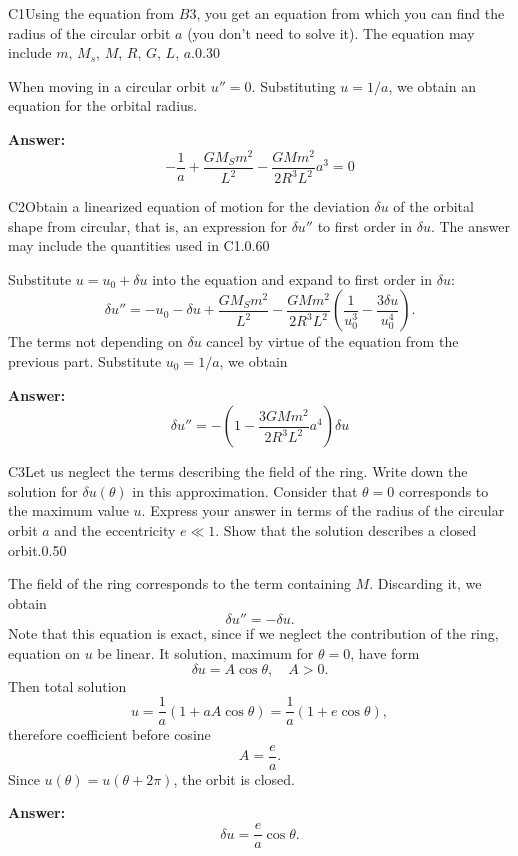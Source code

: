 \documentclass[11pt,a4paper]{article}
\begin{document}
\begin{solcard}{C1}{Using the equation from $B3$, you get an equation from which you can find the radius of the circular orbit $a$ (you don't need to solve it). The equation may include $m$, $M_s$, $M$, $R$, $G$, $L$, $a$.}{0.30}

When moving in a circular orbit $u'' = 0$. Substituting $u = 1/a$, we obtain an equation for the orbital radius.

\par\smallskip\noindent\textbf{Answer:} $$ - \frac{1}{a} + \frac{G M_S m^2 }{L^2}- \frac{GM m^2}{2 R^3 L^2} a^3 = 0 $$
\end{solcard}

\begin{solcard}{C2}{Obtain a linearized equation of motion for the deviation $\delta u$ of the orbital shape from circular, that is, an expression for $\delta u''$ to first order in $\delta u$. The answer may include the quantities used in C1.}{0.60}

Substitute $u = u_0 + \delta u$ into the equation and expand to first order in $\delta u$: $$ \delta u '' = - u_0 - \delta u+  \frac{G M_S m^2 }{L^2} - \frac{GM m^2}{2 R^3 L^2} \left(\frac{1}{u_0^3}  - \frac{3 \delta u}{u_0^4} \right). $$The terms not depending on $\delta u$ cancel by virtue of the equation from the previous part. Substitute $u_0 = 1/a$, we obtain

\par\smallskip\noindent\textbf{Answer:} $$ \delta u'' = - \left( 1 - \frac{3 G M m^2}{2 R^3 L^2} a^4\right) \delta u $$
\end{solcard}

\begin{solcard}{C3}{Let us neglect the terms describing the field of the ring. Write down the solution for $\delta u(\theta)$ in this approximation. Consider that $\theta = 0$ corresponds to the maximum value $u$. Express your answer in terms of the radius of the circular orbit $a$ and the eccentricity $e \ll 1$. Show that the solution describes a closed orbit.}{0.50}

The field of the ring corresponds to the term containing $M$. Discarding it, we obtain $$ \delta u ''  = - \delta u. $$Note that this equation is exact, since if we neglect the contribution of the ring, equation on $u$ be linear. It solution, maximum for $\theta = 0$, have form $$ \delta u = A \cos \theta, \quad A > 0. $$Then total solution $$ u = \frac{1}{a} \left(1 + a A \cos \theta \right) = \frac{1}{a} \left(1 + e \cos \theta \right), $$therefore coefficient before cosine $$ A = \frac{e}{a}. $$Since $u(\theta) = u(\theta + 2\pi)$, the orbit is closed.

\par\smallskip\noindent\textbf{Answer:} $$ \delta u = \frac{e}{a } \cos \theta. $$
\end{solcard}
\end{document}
